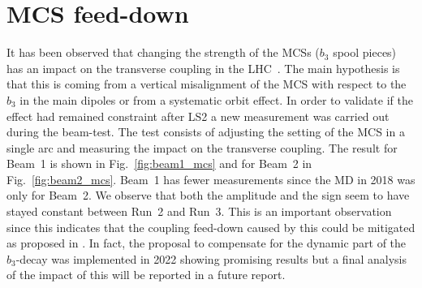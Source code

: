 \documentclass[a4paper]{cernatsnote}
\begin{document}

\section{MCS feed-down}
It has been observed that changing the strength of the MCSs ($b_3$ spool pieces) has an impact on the transverse coupling in the LHC~\cite{counter_acting_coupling_decay}. The main hypothesis is that this is coming from a vertical misalignment of the MCS with respect to the $b_3$ in the main dipoles or from a systematic orbit effect. In order to validate if the effect had remained constraint after LS2 a new measurement was carried out during the beam-test. The test consists of adjusting the setting of the MCS in a single arc and measuring the impact on the transverse coupling. The result for Beam~1 is shown in Fig.~\ref{fig:beam1_mcs} and for Beam~2 in  Fig.~\ref{fig:beam2_mcs}. Beam~1 has fewer measurements since the MD in 2018 was only for Beam~2. We observe that both the amplitude and the sign seem to have stayed constant between Run~2 and Run~3. This is an important observation since this indicates that the coupling feed-down caused by this could be mitigated as proposed in \cite{counter_acting_coupling_decay}. In fact, the proposal to compensate for the dynamic part of the $b_3$-decay was implemented in 2022 showing promising results but a final analysis of the impact of this will be reported in a future report.
\end{document}

